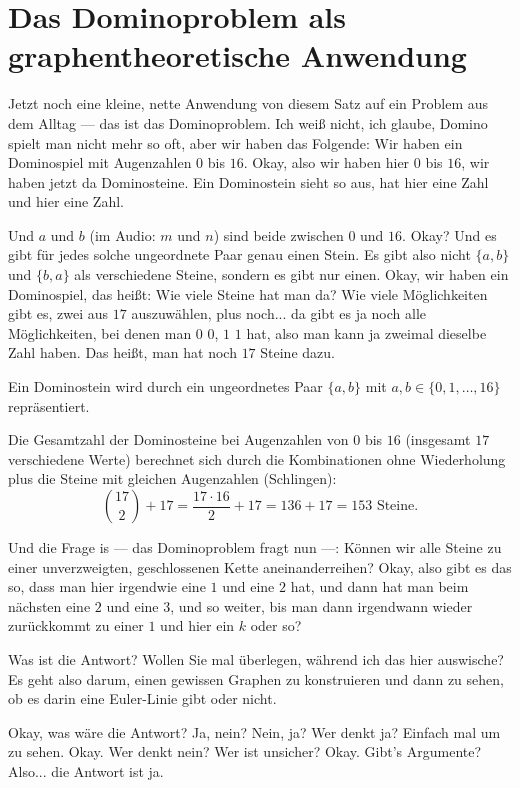 \section{Das Dominoproblem als graphentheoretische Anwendung}

\begin{spoken-clean}[00:17:28 - 00:19:30]
Jetzt noch eine kleine, nette Anwendung von diesem Satz auf ein Problem aus dem Alltag --- das ist das Dominoproblem. Ich weiß nicht, ich glaube, Domino spielt man nicht mehr so oft, aber wir haben das Folgende: Wir haben ein Dominospiel mit Augenzahlen $0$ bis $16$. Okay, also wir haben hier $0$ bis $16$, wir haben jetzt da Dominosteine. Ein Dominostein sieht so aus, hat hier eine Zahl und hier eine Zahl. 

Und $a$ und $b$ (im Audio: $m$ und $n$) sind beide zwischen $0$ und $16$. Okay? Und es gibt für jedes solche ungeordnete Paar genau einen Stein. Es gibt also nicht $\{a, b\}$ und $\{b, a\}$ als verschiedene Steine, sondern es gibt nur einen. Okay, wir haben ein Dominospiel, das heißt: Wie viele Steine hat man da? Wie viele Möglichkeiten gibt es, zwei aus $17$ auszuwählen, plus noch... da gibt es ja noch alle Möglichkeiten, bei denen man $0$ $0$, $1$ $1$ hat, also man kann ja zweimal dieselbe Zahl haben. Das heißt, man hat noch $17$ Steine dazu.
\end{spoken-clean}

\begin{math-stroke}
Ein Dominostein wird durch ein ungeordnetes Paar $\{a, b\}$ mit $a, b \in \{0, 1, \dots, 16\}$ repräsentiert.
\par\vspace{1ex}\noindent
Die Gesamtzahl der Dominosteine bei Augenzahlen von $0$ bis $16$ (insgesamt $17$ verschiedene Werte) berechnet sich durch die Kombinationen ohne Wiederholung plus die Steine mit gleichen Augenzahlen (Schlingen):
\[
\binom{17}{2} + 17 = \frac{17 \cdot 16}{2} + 17 = 136 + 17 = 153 \text{ Steine}.
\]
\end{math-stroke}

\begin{spoken-clean}[00:19:30 - 00:20:50]
Und die Frage is --- das Dominoproblem fragt nun ---: Können wir alle Steine zu einer unverzweigten, geschlossenen Kette aneinanderreihen?  Okay, also gibt es das so, dass man hier irgendwie eine $1$ und eine $2$ hat, und dann hat man beim nächsten eine $2$ und eine $3$, und so weiter, bis man dann irgendwann wieder zurückkommt zu einer $1$ und hier ein $k$ oder so? 

Was ist die Antwort? Wollen Sie mal überlegen, während ich das hier auswische?  Es geht also darum, einen gewissen Graphen zu konstruieren und dann zu sehen, ob es darin eine Euler-Linie gibt oder nicht.

Okay, was wäre die Antwort? Ja, nein? Nein, ja? Wer denkt ja? Einfach mal um zu sehen. Okay. Wer denkt nein? Wer ist unsicher? Okay. Gibt's Argumente? Also... die Antwort ist ja. 
\end{spoken-clean}

